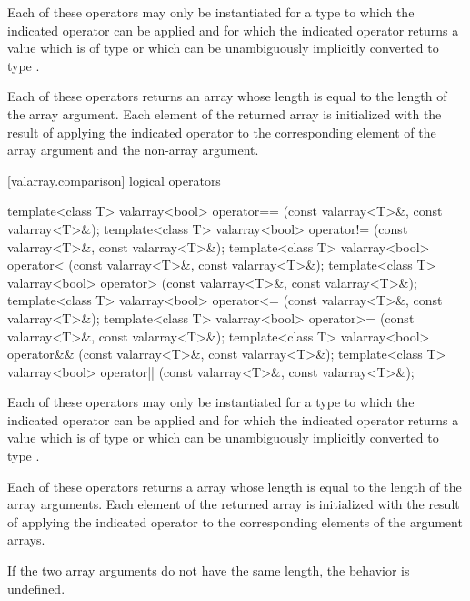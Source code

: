 \begin{itemdescr}
\pnum
Each of these operators may only be instantiated for a type 
to which the indicated operator can be applied and for which
the indicated operator returns a value which is of type 
or which can be unambiguously implicitly converted to type .

\pnum
Each of these operators returns an array whose length is equal to the
length of the array argument.
Each element of the returned array is
initialized with the result of applying the indicated operator to the
corresponding element of the array argument and the non-array argument.
\end{itemdescr}

[valarray.comparison]{ logical operators}

%
%
%
%
%
%
%
%
\begin{itemdecl}
template<class T> valarray<bool> operator==
    (const valarray<T>&, const valarray<T>&);
template<class T> valarray<bool> operator!=
    (const valarray<T>&, const valarray<T>&);
template<class T> valarray<bool> operator<
    (const valarray<T>&, const valarray<T>&);
template<class T> valarray<bool> operator>
    (const valarray<T>&, const valarray<T>&);
template<class T> valarray<bool> operator<=
    (const valarray<T>&, const valarray<T>&);
template<class T> valarray<bool> operator>=
    (const valarray<T>&, const valarray<T>&);
template<class T> valarray<bool> operator&&
    (const valarray<T>&, const valarray<T>&);
template<class T> valarray<bool> operator||
    (const valarray<T>&, const valarray<T>&);
\end{itemdecl}

\begin{itemdescr}
\pnum
Each of these operators may only be instantiated for a type 
to which the indicated operator can be applied and for which
the indicated operator returns a value which is of type 
or which can be unambiguously implicitly converted to type .

\pnum
Each of these operators returns a  array whose length
is equal to the length of the array arguments.
Each element of the returned
array is initialized with the result of applying the indicated
operator to the corresponding elements of the argument arrays.

\pnum
If the two array arguments do not have the same length,
the behavior is undefined.%
\end{itemdescr}

